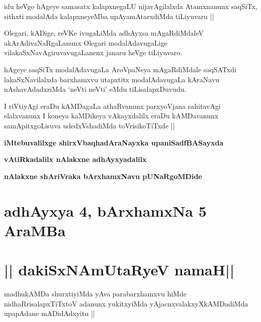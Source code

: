 \begin{artha}
idu heVgo hAgeye samasatx kalapxnegaLU nijavAgilalxda Atamxnanunx saqSiTx, sithxti modalAda kalapxneyeMba upAyamAtarxdiMda tiLiyuvaru ||
\end{artha}


\begin{artha}
Olegari, kADige, reVKe ivugaLiMda adhAyxsa mAgaRdiMdaleV akArAdivaNaRgaLanunx Olegari modalAdavugaLige vilakaSxNavAgiruvavugaLanenx janaru heVge tiLiyuvaro.
\end{artha}

\begin{artha}
hAgeye saqSiTx modalAdavugaLa AroVpaNeya mAgaRdiMdale saqSATxdi lakaSxNavilalxda barxhamxvu utapxtitx modalAdavugaLa kAraNavu nAshavAdadxriMda `neVti neVti' eMdu tiLisalapxDuvudu.
\end{artha}


\begin{artha}
I riVtiyAgi eraDu kAMDagaLa athaRvanunx parxyoVjana sahitavAgi elalxvanunx I koneya kaMDikeya vAkayxdalilx eraDu kAMDavanunx samApitxgoLisuva udedxVshadiMda toVrisikoTiTxde ||
\end{artha}

\bigskip
\begin{center}
{\bf iMtebuvalilxge shirxVbaqhadAraNayxka upaniSadfBASayxda}

\smallskip
{\bf vAtiRkadalilx nAlakxne adhAyxyadalilx}

\smallskip
{\bf nAlakxne shAriVraka bArxhamxNavu pUNaRgoMDide}
\end{center}
\bigskip

\section*{adhAyxya 4, bArxhamxNa 5 AraMBa}

\section*{|| dakiSxNAmUtaRyeV namaH||}

\begin{artha}
madhukAMDa shurxtiyiMda yAva parabarxhamxvu hiMde nidhaRrisalapxTiTxtoV adanunx yukitxyiMda yAjacnxvalakxyXkAMDadiMda upapAdane mADidAdxyitu ||
\end{artha}

